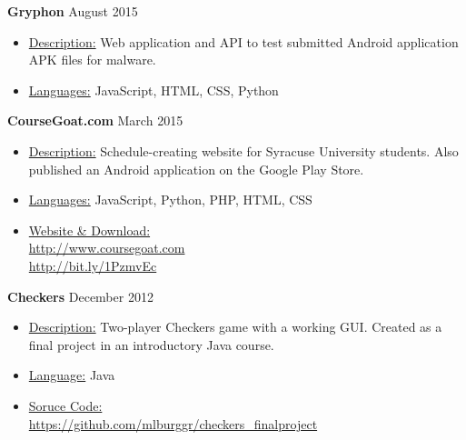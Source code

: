 \documentclass[margin]{res}
\begin{document}
\begin{resume}
{\bf Gryphon} \hfill August 2015
\begin{itemize}
 \item \underline{Description:} Web application and API to test submitted Android application APK files for malware. \
 \item \underline{Languages:} JavaScript, HTML, CSS, Python\
\end{itemize}

{\bf CourseGoat.com} \hfill March 2015
\begin{itemize}
 \item \underline{Description:} Schedule-creating website for Syracuse University students. Also published an Android application on the Google Play Store.\
 \item \underline{Languages:} JavaScript, Python, PHP, HTML, CSS
 \item \underline{Website \& Download:} \\ \url{http://www.coursegoat.com}
 \\ \url{http://bit.ly/1PzmvEc}
 
\end{itemize}

{\bf Checkers} \hfill December 2012
\begin{itemize}
 \item \underline{Description:} Two-player Checkers game with a working GUI. Created as a final project in an introductory Java course.\
 \item \underline{Language:} Java
 \item \underline{Soruce Code:} \\
 \url{https://github.com/mlburggr/checkers_finalproject}\
\end{itemize}






\end{resume} 
\end{document}
